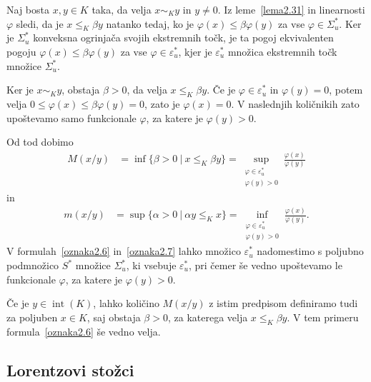 \documentclass[mat2, tisk]{fmfdelo}
\begin{document}
Naj bosta $x,y\in K$ taka, da velja $x\sim_K y$ in $y\neq0$.
Iz leme~\ref{lema2.31} in linearnosti $\varphi$ sledi, da je
$x\leq_K\beta y$ natanko tedaj, ko je
$\varphi(x)\leq\beta\varphi(y)$ za vse
$\varphi\in\Sigma_u^*$.
Ker je $\Sigma_u^*$ konveksna ogrinjača svojih
ekstremnih točk, je ta pogoj ekvivalenten pogoju
$\varphi(x)\leq\beta\varphi(y)$ za vse
$\varphi\in\varepsilon_u^*$,
kjer je $\varepsilon_u^*$ množica ekstremnih točk
množice $\Sigma_u^*$.

Ker je $x\sim_K y$, obstaja $\beta>0$, da velja
$x\leq_K\beta y$.
Če je $\varphi\in\varepsilon_u^*$ in $\varphi(y)=0$,
potem velja
$0\leq\varphi(x)\leq\beta\varphi(y)=0$,
zato je $\varphi(x)=0$.
V naslednjih količnikih zato upoštevamo samo
funkcionale $\varphi$, za katere je $\varphi(y)>0$.

Od tod dobimo
\begin{align}
  M(x/y)
  &=
  \inf\{\beta>0~|~x\leq_K\beta y\}
  =
  \sup_{\substack{\varphi\in\varepsilon_u^*\\
                  \varphi(y)>0}}
  \frac{\varphi(x)}{\varphi(y)}
  \label{oznaka2.6}
\end{align}
in
\begin{align}
  m(x/y)
  &=
  \sup\{\alpha>0~|~\alpha y\leq_K x\}
  =
  \inf_{\substack{\varphi\in\varepsilon_u^*\\
                  \varphi(y)>0}}
  \frac{\varphi(x)}{\varphi(y)}.
  \label{oznaka2.7}
\end{align}
V formulah~\eqref{oznaka2.6} in~\eqref{oznaka2.7}
lahko množico $\varepsilon_u^*$ nadomestimo
s poljubno podmnožico $S^*$ množice $\Sigma_u^*$,
ki vsebuje $\varepsilon_u^*$, pri čemer še vedno
upoštevamo le funkcionale $\varphi$,
za katere je $\varphi(y)>0$.

Če je $y\in\operatorname{int}(K)$, lahko količino
$M(x/y)$ z istim predpisom definiramo tudi za
poljuben $x\in K$, saj obstaja $\beta>0$, za katerega
velja $x\leq_K\beta y$.
V tem primeru formula~\eqref{oznaka2.6} še vedno velja.






\subsection{Lorentzovi stožci}
\end{document}

